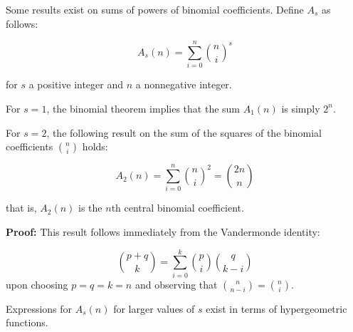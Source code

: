 \documentclass[12pt]{article}
\begin{document}
Some results exist on sums of powers of binomial coefficients.  Define $A_s$ as follows:

\[ A_s(n) = \sum_{i=0}^n {n \choose i}^s \]

for $s$ a positive integer and $n$ a nonnegative integer.

For $s=1$, the binomial theorem implies that the sum $A_1(n)$ is simply $2^n$.

For $s=2$, the following result on the sum of the squares of the binomial coefficients ${n \choose i}$ holds:

\[ A_2(n) = \sum_{i=0}^n {n \choose i}^2 = {2n \choose n} \]

that is, $A_2(n)$ is the $n$th central binomial coefficient.

{\bf Proof:}
This result follows immediately from the Vandermonde identity:

\[ {p+q \choose k}=\sum_{i=0}^k {p \choose i} {q \choose k-i} \]
upon choosing $p=q=k=n$ and observing that ${n \choose n-i}={n \choose i}$.

Expressions for $A_s(n)$ for larger values of $s$ exist in terms of hypergeometric functions.
\end{document}
